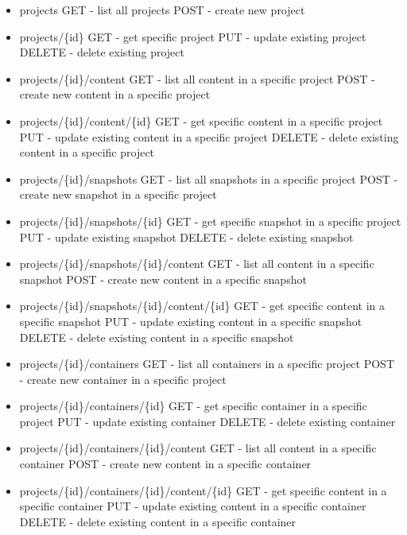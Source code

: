 \documentclass[a4paper,12pt]{article}
\begin{document}
\begin{itemize}
  \item projects
      \subitem GET - list all projects
      \subitem POST - create new project
  \item projects/\{id\}
      \subitem GET - get specific project
      \subitem PUT - update existing project
      \subitem DELETE - delete existing project
  \item projects/\{id\}/content
      \subitem GET - list all content in a specific project
      \subitem POST - create new content in a specific project 
  \item projects/\{id\}/content/\{id\}
      \subitem GET - get specific content in a specific project
      \subitem PUT - update existing content in a specific project
      \subitem DELETE - delete existing content in a specific project

  \item projects/\{id\}/snapshots
      \subitem GET - list all snapshots in a specific project
      \subitem POST - create new snapshot in a specific project 
  \item projects/\{id\}/snapshots/\{id\}
      \subitem GET - get specific snapshot in a specific project
      \subitem PUT - update existing snapshot
      \subitem DELETE - delete existing snapshot
  \item projects/\{id\}/snapshots/\{id\}/content
      \subitem GET - list all content in a specific snapshot
      \subitem POST - create new content in a specific snapshot 
  \item projects/\{id\}/snapshots/\{id\}/content/\{id\}
      \subitem GET - get specific content in a specific snapshot
      \subitem PUT - update existing content in a specific snapshot
      \subitem DELETE - delete existing content in a specific snapshot

  \item projects/\{id\}/containers
      \subitem GET - list all containers in a specific project
      \subitem POST - create new container in a specific project 
  \item projects/\{id\}/containers/\{id\}
      \subitem GET - get specific container in a specific project
      \subitem PUT - update existing container
      \subitem DELETE - delete existing container
  \item projects/\{id\}/containers/\{id\}/content
      \subitem GET - list all content in a specific container
      \subitem POST - create new content in a specific container 
  \item projects/\{id\}/containers/\{id\}/content/\{id\}
      \subitem GET - get specific content in a specific container
      \subitem PUT - update existing content in a specific container
      \subitem DELETE - delete existing content in a specific container
\end{itemize}
\end{document}
